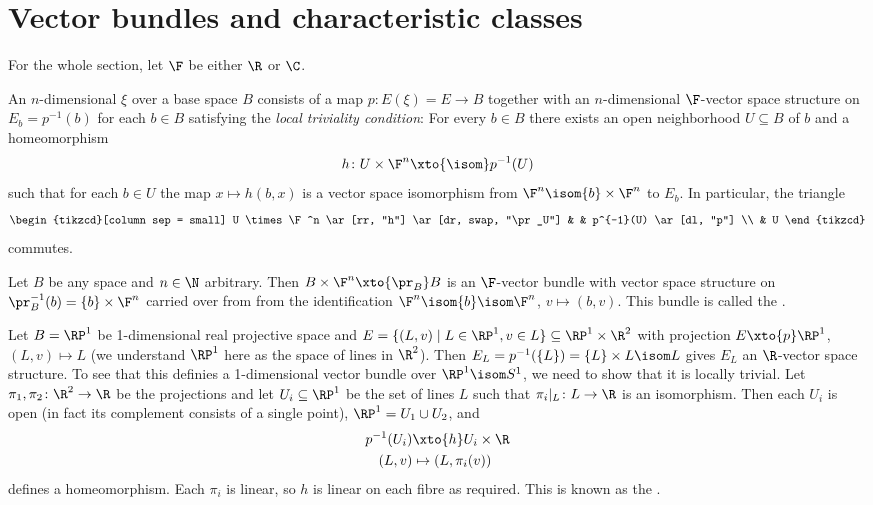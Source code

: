 \section{Vector bundles and characteristic classes}
For the whole section, let $\F$ be either $\R$ or $\C$.
\begin{definition}
	An $n$-dimensional  $\xi$ over a base space $B$ consists of a map $p\colon E(\xi) = E \to B$ together with an $n$-dimensional $\F$-vector space structure on $E_b = p^{-1}(b)$ for each $b \in B$ satisfying the \emph{local triviality condition}:
	For every $b \in B$ there exists an open neighborhood $U \subseteq B$ of $b$ and a homeomorphism
	\begin{equation*}
		h\colon U \times \F^n \xto{\isom} p^{-1}(U)
	\end{equation*}
	such that for each $b \in U$ the map $x \mapsto h(b, x)$ is a vector space isomorphism from $\F^n \isom \{b\} \times \F^n$ to $E_b$.
	In particular, the triangle
	\begin{equation*}
		\begin{tikzcd}[column sep = small]
			U \times \F^n 
					\ar[rr, "h"]
					\ar[dr, swap, "\pr_U"]
				& & p^{-1}(U)
					\ar[dl, "p"]
			\\
				& U
		\end{tikzcd}
	\end{equation*}
	commutes.
\end{definition}
\begin{example}
	Let $B$ be any space and $n \in \N$ arbitrary.
	Then $B \times \F^n \xto{\pr_B} B$ is an $\F$-vector bundle with vector space structure on $\pr_B^{-1}(b) = \{b\} \times \F^n$ carried over from from the identification $\F^n \isom \{b\} \isom \F^n$, $v \mapsto (b, v)$.
	This bundle is called the .
\end{example}
\begin{example}
	Let $B = \RP^1$ be 1-dimensional real projective space and $E = \{(L, v) \mid L \in \RP^1, v \in L\} \subseteq \RP^1 \times \R^2$ with projection $E \xto{p} \RP^1$, $(L, v) \mapsto L$ (we understand $\RP^1$ here as the space of lines in $\R^2$).
	Then $E_L = p^{-1}(\{L\}) = \{L\} \times L \isom L$ gives $E_L$ an $\R$-vector space structure.
	To see that this definies a 1-dimensional vector bundle over $\RP^1 \isom S^1$, we need to show that it is locally trivial.
	Let $\pi_1, \pi_2\colon \R^2 \to \R$ be the projections and let $U_i \subseteq \RP^1$ be the set of lines $L$ such that $\pi_i|_L\colon L \to \R$ is an isomorphism.
	Then each $U_i$ is open (in fact its complement consists of a single point), $\RP^1 = U_1 \cup U_2$, and
	\begin{align*}
		p^{-1}(U_i) &\xto{h} U_i \times \R \\
		(L, v) &\mapsto (L, \pi_i(v))
	\end{align*}
	defines a homeomorphism.
	Each $\pi_i$ is linear, so $h$ is linear on each fibre as required.
	This is known as the .
\end{example}
